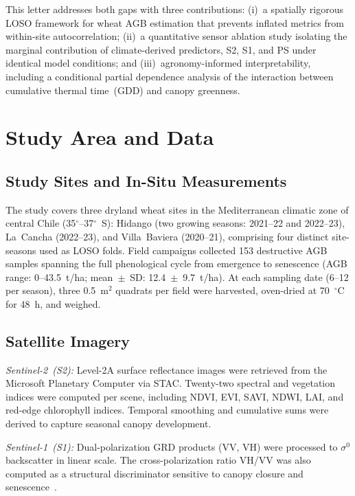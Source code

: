 \documentclass[lettersize,journal]{IEEEtran}
\begin{document}
This letter addresses both gaps with three contributions: (i)~a spatially
rigorous LOSO framework for wheat AGB estimation that prevents inflated metrics
from within-site autocorrelation; (ii)~a quantitative sensor ablation study
isolating the marginal contribution of climate-derived predictors, S2, S1, and
PS under identical model conditions; and (iii)~agronomy-informed
interpretability, including a conditional partial dependence analysis of the
interaction between cumulative thermal time~(GDD) and canopy greenness.
\IEEEpubidadjcol

\section{Study Area and Data}

\subsection{Study Sites and In-Situ Measurements}

The study covers three dryland wheat sites in the Mediterranean climatic zone
of central Chile (35$^{\circ}$--37$^{\circ}$~S): Hidango (two growing seasons:
2021--22 and 2022--23), La~Cancha (2022--23), and Villa~Baviera (2020--21),
comprising four distinct site-seasons used as LOSO folds. Field campaigns
collected 153 destructive AGB samples spanning the full phenological cycle from
emergence to senescence (AGB range: 0--43.5~t/ha; mean~$\pm$~SD:
12.4~$\pm$~9.7~t/ha). At each sampling date (6--12 per season), three
0.5~m$^2$ quadrats per field were harvested, oven-dried at 70~$^{\circ}$C for
48~h, and weighed.

\subsection{Satellite Imagery}

\textit{Sentinel-2~(S2):} Level-2A surface reflectance images were retrieved
from the Microsoft Planetary Computer via STAC. Twenty-two spectral and
vegetation indices were computed per scene, including NDVI, EVI, SAVI, NDWI,
LAI, and red-edge chlorophyll indices. Temporal smoothing and cumulative sums
were derived to capture seasonal canopy development.

\textit{Sentinel-1~(S1):} Dual-polarization GRD products (VV, VH) were
processed to $\sigma^0$ backscatter in linear scale. The cross-polarization
ratio VH/VV was also computed as a structural discriminator sensitive to
canopy closure and senescence~\cite{ref13}.
\end{document}
